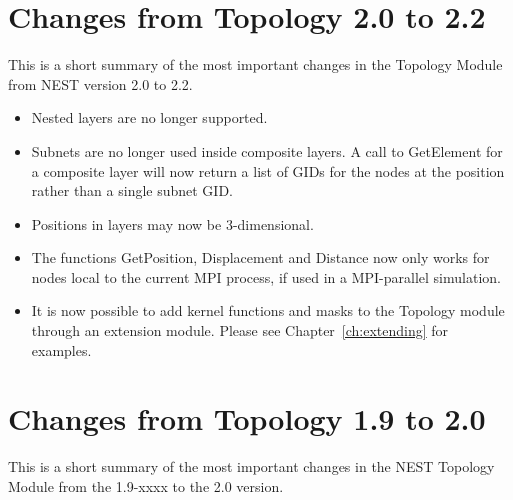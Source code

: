 \documentclass[a4paper,12pt]{report}
\begin{document}
\section{Changes from Topology 2.0 to 2.2}

This is a short summary of the most important changes in the Topology
Module from NEST version 2.0 to 2.2.

\begin{itemize}
\item Nested layers are no longer supported.
\item Subnets are no longer used inside composite layers. A call to
  GetElement for a composite layer will now return a list of GIDs for the
  nodes at the position rather than a single subnet GID.
\item Positions in layers may now be 3-dimensional.
\item The functions GetPosition, Displacement and Distance now only works
  for nodes local to the current MPI process, if used in a MPI-parallel
  simulation.
\item It is now possible to add kernel functions and masks to the Topology
  module through an extension module. Please see Chapter~\ref{ch:extending}
  for examples.
\end{itemize}

\section{Changes from Topology 1.9 to 2.0}

This is a short summary of the most important changes in the NEST
Topology Module from the 1.9-xxxx to the 2.0 version.
\end{document}
